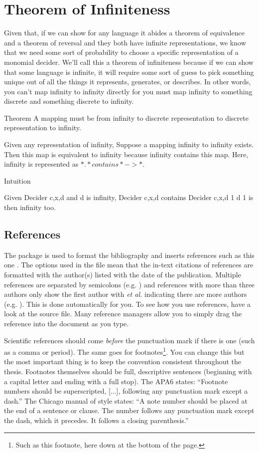 \section{Theorem of Infiniteness}

Given that, if we can show for any language it abides a theorem of equivalence and a theorem of reversal and they both have infinite representations, we know that we need some sort of probability to choose a specific representation of a monomial decider. We'll call this a theorem of infiniteness because if we can show that some language is infinite, it will require some sort of guess to pick something unique out of all the things it represents, generates, or describes. In other words, you can't map infinity to infinity directly for you must map infinity to something discrete and something discrete to infinity.

Theorem
A mapping must be from infinity to discrete representation to discrete representation to infinity.

Given any representation of infinity,
Suppose a mapping infinity to infinity exists.
Then this map is equivalent to infinity because 
infinity contains this map.
Here, infinity is represented as $\ast. \ast contains \ast -> \ast.$

Intuition

Given Decider c,x,d and d is infinity,
Decider c,x,d contains Decider c,x,d 1
d 1 is then infinity too.


\subsection{References}

The  package is used to format the bibliography and inserts references such as this one \parencite{Reference1}. The options used in the  file mean that the in-text citations of references are formatted with the author(s) listed with the date of the publication. Multiple references are separated by semicolons (e.g. \parencite{Reference2, Reference1}) and references with more than three authors only show the first author with \emph{et al.} indicating there are more authors (e.g. \parencite{Reference3}). This is done automatically for you. To see how you use references, have a look at the  source file. Many reference managers allow you to simply drag the reference into the document as you type.

Scientific references should come \emph{before} the punctuation mark if there is one (such as a comma or period). The same goes for footnotes\footnote{Such as this footnote, here down at the bottom of the page.}. You can change this but the most important thing is to keep the convention consistent throughout the thesis. Footnotes themselves should be full, descriptive sentences (beginning with a capital letter and ending with a full stop). The APA6 states: \enquote{Footnote numbers should be superscripted, [...], following any punctuation mark except a dash.} The Chicago manual of style states: \enquote{A note number should be placed at the end of a sentence or clause. The number follows any punctuation mark except the dash, which it precedes. It follows a closing parenthesis.}

